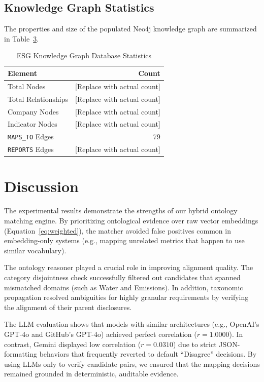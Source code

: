 \documentclass[journal,compsoc]{IEEEtran}
\begin{document}
\begin{itemize}
\begin{table}[t]
\begin{itemize}
\begin{table}[t]
\subsection{Knowledge Graph Statistics}
The properties and size of the populated Neo4j knowledge graph are summarized in Table~\ref{tab:kg_stats}.

\begin{table}[h]
\centering
\caption{ESG Knowledge Graph Database Statistics}
\label{tab:kg_stats}
\begin{tabular}{lr}
\toprule
\textbf{Element} & \textbf{Count} \\
\midrule
Total Nodes & [Replace with actual count] \\
Total Relationships & [Replace with actual count] \\
Company Nodes & [Replace with actual count] \\
Indicator Nodes & [Replace with actual count] \\
\texttt{MAPS\_TO} Edges & 79 \\
\texttt{REPORTS} Edges & [Replace with actual count] \\
\bottomrule
\end{tabular}
\end{table}

\section{Discussion}
The experimental results demonstrate the strengths of our hybrid ontology matching engine. By prioritizing ontological evidence over raw vector embeddings (Equation~\ref{eq:weighted}), the matcher avoided false positives common in embedding-only systems (e.g., mapping unrelated metrics that happen to use similar vocabulary). 

The ontology reasoner played a crucial role in improving alignment quality. The category disjointness check successfully filtered out candidates that spanned mismatched domains (such as Water and Emissions). In addition, taxonomic propagation resolved ambiguities for highly granular requirements by verifying the alignment of their parent disclosures.

The LLM evaluation shows that models with similar architectures (e.g., OpenAI's GPT-4o and GitHub's GPT-4o) achieved perfect correlation ($r = 1.0000$). In contrast, Gemini displayed low correlation ($r = 0.0310$) due to strict JSON-formatting behaviors that frequently reverted to default ``Disagree'' decisions. By using LLMs only to verify candidate pairs, we ensured that the mapping decisions remained grounded in deterministic, auditable evidence.


\end{table}
\end{itemize}
\end{table}
\end{itemize}
\end{document}
